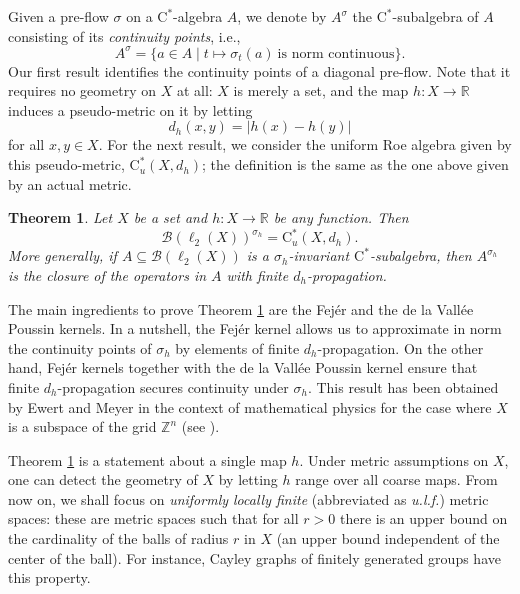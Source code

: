 \documentclass[11pt]{amsart}
\newcommand{\R}{\mathbb{R}}
\newcommand{\Z}{\mathbb{Z}}
\newcommand{\cstu}{\mathrm{C}^*_u}
\numberwithin{equation}{section}
\newtheorem{theoremi}{Theorem}
\theoremstyle{definition}
\theoremstyle{remark}
\begin{document}
Given a pre-flow $\sigma$ on a $\mathrm{C}^*$-algebra $A$, we denote by
$A^\sigma$ the $\mathrm{C}^*$-subalgebra of $A$ consisting of its
\emph{continuity points}, i.e.,
\[
A^\sigma=\{a\in A\mid t\mapsto \sigma_t(a)\ \text{is norm continuous}\}.
\]
Our first result identifies the continuity points of a diagonal pre-flow. Note
that it requires no geometry on $X$ at all: $X$ is merely a set, and the map
$h\colon X\to \R$ induces a pseudo-metric on it by letting  \[d_h(x,y)=|h(x)-h(y)|\] for all $x,y\in X$. For the next result, we consider the uniform Roe algebra given by this pseudo-metric, $\cstu(X,d_h)$; the definition is the same as the one above given by an actual metric.

\begin{theoremi}
Let $X$ be a set and $h\colon X\to\mathbb{R}$ be any function. Then
\[
\mathcal{B}(\ell_2(X))^{\sigma_h}=\mathrm{C}^*_u(X,d_h).
\]
More generally, if $A\subseteq\mathcal{B}(\ell_2(X))$ is a $\sigma_h$-invariant
$\mathrm{C}^*$-subalgebra, then $A^{\sigma_h}$ is the closure of the operators
in $A$ with finite $d_h$-propagation.\label{thmA}
\end{theoremi}

The main ingredients to prove Theorem \ref{thmA} are the
Fejér  and the   de la Vall\'ee Poussin kernels. In a nutshell, the Fejér kernel allows us to approximate in norm the  continuity points of $\sigma_h$ by elements of finite $d_h$-propagation. On the other hand, Fejér kernels together with  the   de la Vall\'ee Poussin kernel ensure that finite $d_h$-propagation secures continuity under $\sigma_h$. This result has been obtained by   Ewert and Meyer in the context of mathematical physics for the case where $X$ is a subspace of the grid $\Z^n$ (see \cite[Theorem 4]{EwertMeyer2019CMP}). 

Theorem \ref{thmA} is a statement about a single map $h$. Under metric assumptions on $X$, one can detect the geometry of $X$ by letting $h$ range over
all coarse maps. From now on, we shall focus on \emph{uniformly locally finite} (abbreviated as \emph{u.l.f.}) metric spaces: these are metric spaces such that for all $r>0$ there is an upper bound on the cardinality of the balls of radius $r$ in $X$ (an upper bound independent of the center of the ball). For instance, Cayley graphs of finitely generated groups have this property. 
\end{document}
